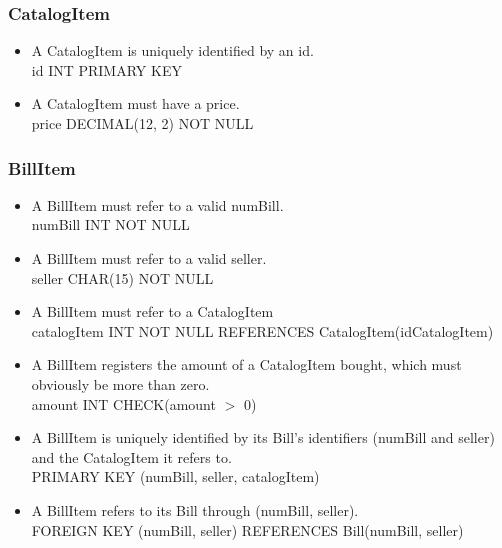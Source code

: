 \documentclass{report}[a4paper]
\theoremstyle{remark}
\begin{document}
\subsubsection{CatalogItem}
\begin{itemize}
    \item A CatalogItem is uniquely identified by an id. \\ id INT PRIMARY KEY
    \item A CatalogItem must have a price. \\ price DECIMAL(12, 2) NOT NULL
\end{itemize}
\subsubsection{BillItem}
\begin{itemize}
    \item A BillItem must refer to a valid numBill. \\ numBill INT NOT NULL
    \item A BillItem must refer to a valid seller. \\ seller CHAR(15) NOT NULL
    \item A BillItem must refer to a CatalogItem \\ catalogItem INT NOT NULL REFERENCES CatalogItem(idCatalogItem)
    \item A BillItem registers the amount of a CatalogItem bought, which must obviously be more than zero. \\ amount INT CHECK(amount $>$ 0)
    \item A BillItem is uniquely identified by its Bill's identifiers (numBill and seller) and the CatalogItem it refers to. \\ PRIMARY KEY (numBill, seller, catalogItem)
    \item A BillItem refers to its Bill through (numBill, seller). \\ FOREIGN KEY (numBill, seller)   REFERENCES Bill(numBill, seller)
\end{itemize}
\end{document}
